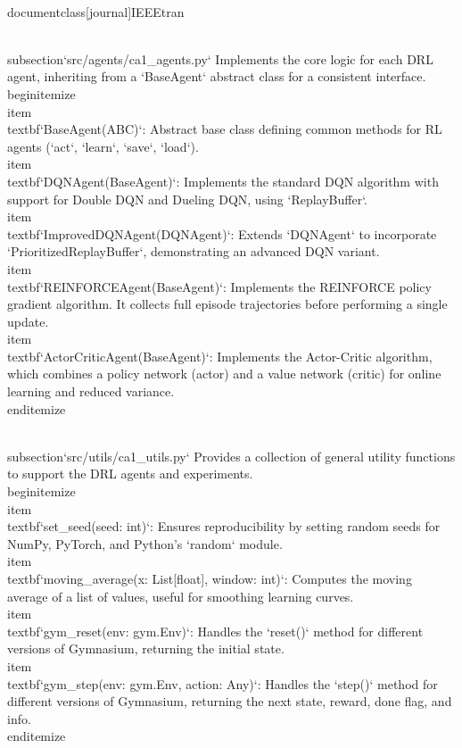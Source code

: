 \\documentclass[journal]{IEEEtran}
\begin{document}
\\subsection{`src/agents/ca1_agents.py`}
Implements the core logic for each DRL agent, inheriting from a `BaseAgent` abstract class for a consistent interface.
\\begin{itemize}
    \\item \\textbf{`BaseAgent(ABC)`}: Abstract base class defining common methods for RL agents (`act`, `learn`, `save`, `load`).
    \\item \\textbf{`DQNAgent(BaseAgent)`}: Implements the standard DQN algorithm with support for Double DQN and Dueling DQN, using `ReplayBuffer`.
    \\item \\textbf{`ImprovedDQNAgent(DQNAgent)`}: Extends `DQNAgent` to incorporate `PrioritizedReplayBuffer`, demonstrating an advanced DQN variant.
    \\item \\textbf{`REINFORCEAgent(BaseAgent)`}: Implements the REINFORCE policy gradient algorithm. It collects full episode trajectories before performing a single update.
    \\item \\textbf{`ActorCriticAgent(BaseAgent)`}: Implements the Actor-Critic algorithm, which combines a policy network (actor) and a value network (critic) for online learning and reduced variance.
\\end{itemize}

\\subsection{`src/utils/ca1_utils.py`}
Provides a collection of general utility functions to support the DRL agents and experiments.
\\begin{itemize}
    \\item \\textbf{`set_seed(seed: int)`}: Ensures reproducibility by setting random seeds for NumPy, PyTorch, and Python's `random` module.
    \\item \\textbf{`moving_average(x: List[float], window: int)`}: Computes the moving average of a list of values, useful for smoothing learning curves.
    \\item \\textbf{`gym_reset(env: gym.Env)`}: Handles the `reset()` method for different versions of Gymnasium, returning the initial state.
    \\item \\textbf{`gym_step(env: gym.Env, action: Any)`}: Handles the `step()` method for different versions of Gymnasium, returning the next state, reward, done flag, and info.
\\end{itemize}
\end{document}
